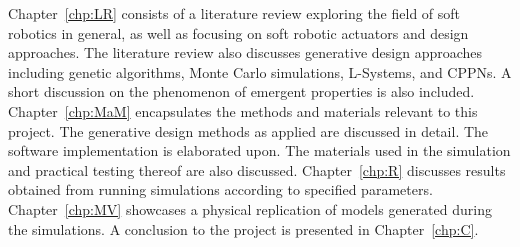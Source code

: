 Chapter~\ref{chp:LR} consists of a literature review exploring the field of soft robotics in general, as well as focusing on soft robotic actuators and design approaches. The literature review also discusses generative design approaches including genetic algorithms, Monte Carlo simulations, L-Systems, and CPPNs. A short discussion on the phenomenon of emergent properties is also included. Chapter~\ref{chp:MaM} encapsulates the methods and materials relevant to this project. The generative design methods as applied are discussed in detail. The software implementation is elaborated upon. The materials used in the simulation and practical testing thereof are also discussed. Chapter~\ref{chp:R} discusses results obtained from running simulations according to specified parameters. Chapter~\ref{chp:MV} showcases a physical replication of models generated during the simulations. A conclusion to the project is presented in Chapter~\ref{chp:C}.